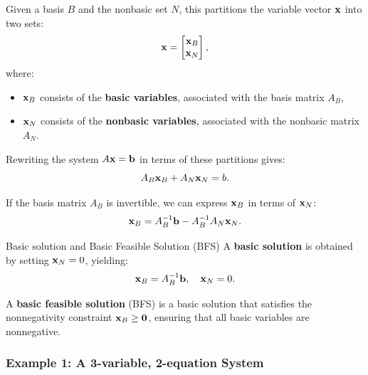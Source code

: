  Given a basis $B$ and the nonbasic set $N$, this partitions the variable vector \( \mathbf{x} \) into two sets:
\[
\mathbf{x} =
\begin{bmatrix}
    \mathbf{x}_B \\ \mathbf{x}_N
\end{bmatrix},
\]
where:
\begin{itemize}
\item  \( \mathbf{x}_B \) consists of the \textbf{basic variables}, associated with the basis matrix \( A_B \),
\item\( \mathbf{x}_N \) consists of the \textbf{nonbasic variables}, associated with the nonbasic matrix \( A_N \).
\end{itemize}

Rewriting the system \( A\mathbf{x} =\mathbf{b}\) in terms of these partitions gives:
\begin{equation}
A_B \mathbf{x}_B + A_N \mathbf{x}_N = b.
\end{equation}

If the basis matrix \( A_B \) is invertible, we can express \( \mathbf{x}_B \) in terms of \( \mathbf{x}_N \):
\begin{equation}
\mathbf{x}_B = A_B^{-1}\mathbf{b}- A_B^{-1} A_N \mathbf{x}_N.
\end{equation}

\begin{definition}{Basic solution and Basic Feasible Solution (BFS)}{}{}
A \textbf{basic solution} is obtained by setting \( \mathbf{x}_N = 0 \), yielding:
\begin{equation}
\mathbf{x}_B = A_B^{-1} \mathbf{b}, \quad \mathbf{x}_N = 0.
\end{equation}

A \textbf{basic feasible solution} (BFS) is a basic solution that satisfies the nonnegativity constraint \( \mathbf{x}_B \geq \mathbf{0} \), ensuring that all basic variables are nonnegative.
\end{definition}
\subsubsection*{Example 1: A 3-variable, 2-equation System}

